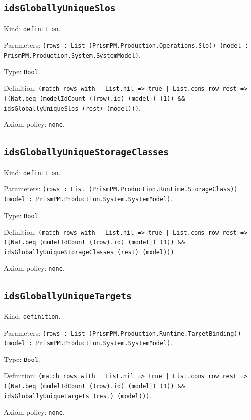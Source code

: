 \documentclass[11pt]{article}
\begin{document}
\subsection*{\texttt{idsGloballyUniqueSlos}}
\noindent Kind: \texttt{definition}.\par
\noindent Parameters: \texttt{(rows : List (PrismPM.Production.Operations.Slo)) (model : PrismPM.Production.System.SystemModel)}.\par
\noindent Type: \texttt{Bool}.\par
\noindent Definition: \texttt{(match rows with | List.nil => true | List.cons row rest => ((Nat.beq (modelIdCount ((row).id) (model)) (1)) \&\& idsGloballyUniqueSlos (rest) (model)))}.\par
\noindent Axiom policy: \texttt{none}.\par
\subsection*{\texttt{idsGloballyUniqueStorageClasses}}
\noindent Kind: \texttt{definition}.\par
\noindent Parameters: \texttt{(rows : List (PrismPM.Production.Runtime.StorageClass)) (model : PrismPM.Production.System.SystemModel)}.\par
\noindent Type: \texttt{Bool}.\par
\noindent Definition: \texttt{(match rows with | List.nil => true | List.cons row rest => ((Nat.beq (modelIdCount ((row).id) (model)) (1)) \&\& idsGloballyUniqueStorageClasses (rest) (model)))}.\par
\noindent Axiom policy: \texttt{none}.\par
\subsection*{\texttt{idsGloballyUniqueTargets}}
\noindent Kind: \texttt{definition}.\par
\noindent Parameters: \texttt{(rows : List (PrismPM.Production.Runtime.TargetBinding)) (model : PrismPM.Production.System.SystemModel)}.\par
\noindent Type: \texttt{Bool}.\par
\noindent Definition: \texttt{(match rows with | List.nil => true | List.cons row rest => ((Nat.beq (modelIdCount ((row).id) (model)) (1)) \&\& idsGloballyUniqueTargets (rest) (model)))}.\par
\noindent Axiom policy: \texttt{none}.\par
\end{document}
